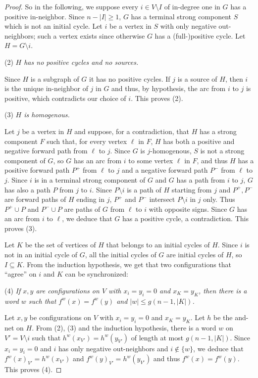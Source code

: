 \documentclass[11pt,letter]{article}
\begin{document}
\begin{proof}
\bigskip
So in the following, we suppose every $i\in V\setminus I$ of in-degree one in $G$ has a positive in-neighbor. Since $n-|I|\geq 1$, $G$ has a terminal strong component $S$ which is not an initial cycle. Let $i$ be a vertex in $S$ with only negative out-neighbors; such a vertex exists since otherwise $G$ has a (full-)positive cycle. Let $H=G\setminus i$. 


\bigskip
\noindent
(2) {\em $H$ has no positive cycles and no sources.}

\medskip
\noindent
Since $H$ is a subgraph of $G$ it has no positive cycles. If $j$ is a source of $H$, then $i$ is the unique in-neighbor of $j$ in $G$ and thus, by hypothesis, the arc from $i$ to $j$ is positive, which contradicts our choice of $i$. This proves (2).


\bigskip
\noindent
(3) {\em $H$ is homogenous.}

\medskip
\noindent
Let $j$ be a vertex in $H$ and suppose, for a contradiction, that $H$ has a strong component $F$ such that, for every vertex $\ell$ in $F$, $H$ has both a positive and negative forward path from $\ell$ to $j$. Since $G$ is $j$-homogenous, $S$ is not a strong component of $G$, so $G$ has an arc from $i$ to some vertex $\ell$ in $F$, and thus $H$ has a positive forward path $P^+$ from $\ell$ to $j$ and a negative forward path $P^-$ from $\ell$ to $j$. Since $i$ is in a terminal strong component of $G$ and $G$ has a path from $i$ to $j$, $G$ has also a path $P$ from $j$ to $i$. Since $P\setminus i$ is a path of $H$ starting from $j$ and $P^+,P^-$ are forward paths of $H$ ending in $j$, $P^+$ and $P^-$ intersect $P\setminus i$ in $j$ only. Thus $P^+\cup P$ and $P^-\cup P$ are paths of $G$ from $\ell$ to $i$ with opposite signs. Since $G$ has an arc from $i$ to $\ell$, we deduce that $G$ has a positive cycle, a contradiction. This proves (3).  

\bigskip
Let $K$ be the set of vertices of $H$ that belongs to an initial cycles of $H$. Since $i$ is not in an initial cycle of $G$, all the initial cycles of $G$ are initial cycles of $H$, so $I\subseteq K$. From the induction hypothesis, we get that two configurations that ``agree'' on $i$ and $K$ can be synchronized:

\bigskip
\noindent
(4) {\em If $x,y$ are configurations on $V$ with $x_i=y_i=0$ and $x_K=y_K$, then there is a word $w$ such that $f^w(x)=f^w(y)$ and $|w|\leq g(n-1,|K|)$.}

\medskip
\noindent
Let $x,y$ be configurations on $V$ with $x_i=y_i=0$ and $x_K=y_K$. Let $h$ be the and-net on $H$. From (2), (3) and the induction hypothesis, there is a word $w$ on $V'=V\setminus i$ such that $h^w(x_{V'})=h^w(y_{V'})$ of length at most $g(n-1,|K|)$. Since $x_i=y_i=0$ and $i$ has only negative out-neighbors and $i\not\in\{w\}$, we deduce that $f^w(x)_{V'}=h^w(x_{V'})$ and  $f^w(y)_{V'}=h^w(y_{V'})$ and thus $f^w(x)=f^w(y)$. This proves (4). 


\end{proof}
\end{document}
